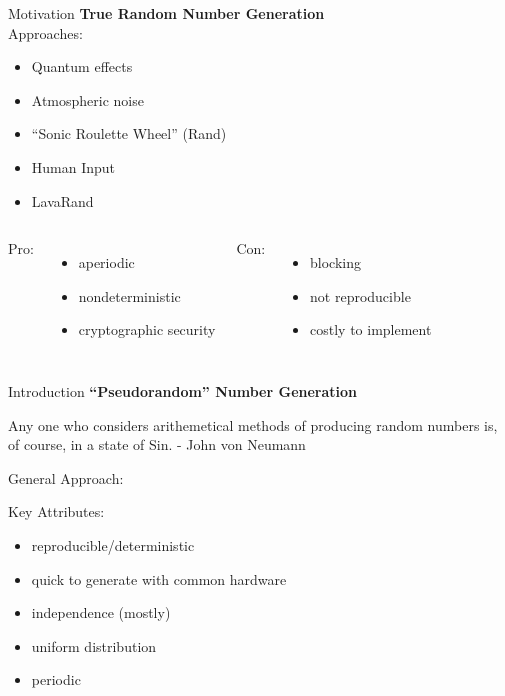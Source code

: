 \documentclass{beamer}
\begin{document}
\begin{frame}{Motivation}
\textbf{True Random Number Generation} \\
Approaches:
\begin{itemize}
\pause \item Quantum effects
\pause \item Atmospheric noise
\pause \item ``Sonic Roulette Wheel'' (Rand)
\pause \item Human Input
\pause \item LavaRand
\end{itemize}
\vskip 0.5cm 
\begin{columns}
\pause
Pro:
\begin{itemize}
\item aperiodic
\item nondeterministic
\item cryptographic security
\end{itemize}
\pause
Con:
\begin{itemize}
\item blocking
\item not reproducible
\item costly to implement
\end{itemize}
\end{columns}
\end{frame}

\begin{frame}{Introduction}
\textbf{``Pseudorandom'' Number Generation}\\
\begin{displayquote}{Any one who considers arithemetical methods of producing random numbers is, of course, in a state of Sin. - John von Neumann}
\end{displayquote}
General Approach:
\pause
Key Attributes:
\begin{itemize}
\pause \item reproducible/deterministic
\pause \item quick to generate with common hardware
\pause \item independence (mostly)
\pause \item uniform distribution
\pause \item periodic
\end{itemize}
\end{frame}
\end{document}
